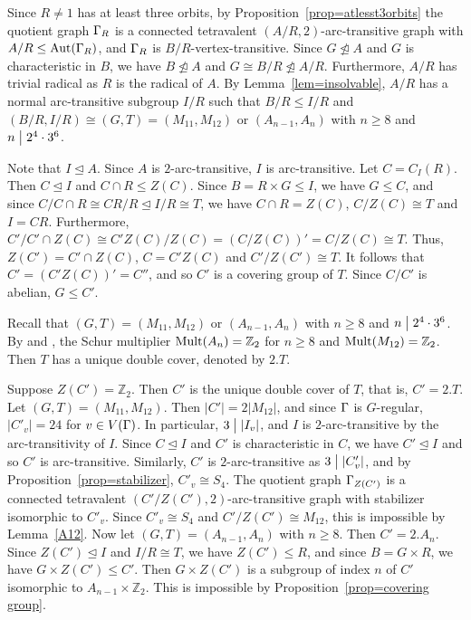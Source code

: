 \documentclass[12pt]{article}
\def\di{\bigm|} \def\lg{\langle} \def\rg{\rangle}
\def\Aut{\hbox{\rm Aut}}
\def\mz{{\mathbb Z}}
\begin{document}
 Since $R\neq 1$ has at least three orbits, by Proposition~\ref{prop=atlesst3orbits} the quotient graph $\Gamma_{R}$ is a connected tetravalent $(A/R,2)$-arc-transitive graph with $A/R\leq \Aut(\G_{R})$, and $\Gamma_R$ is $B/R$-vertex-transitive. Since $G\ntrianglelefteq A$ and $G$ is characteristic in $B$, we have $B\ntrianglelefteq A$ and $G\cong B/R\ntrianglelefteq A/R$. Furthermore, $A/R$ has trivial radical as $R$ is the radical of $A$. By Lemma~\ref{lem=insolvable}, $A/R$ has a normal arc-transitive subgroup $I/R$ such that $B/R\leq  I/R$ and $(B/R,I/R)\cong (G,T)=(M_{11},M_{12})$ or $(A_{n-1},A_n)$ with $n\geq 8$ and $n\di 2^4\cdot 3^6$.

Note that $I\unlhd A$. Since $A$ is $2$-arc-transitive, $I$ is arc-transitive. Let $C=C_I(R)$. Then $C\unlhd I$ and $C\cap R\leq Z(C)$. Since $B=R\times G\leq I$, we have $G\leq C$, and since $C/C\cap R\cong CR/R\unlhd I/R\cong T$, we have $C\cap R=Z(C)$, $C/Z(C)\cong T$ and $I=CR$. Furthermore, $C'/C'\cap Z(C)\cong C'Z(C)/Z(C)=(C/Z(C))'=C/Z(C)\cong  T$. Thus, $Z(C')=C'\cap Z(C)$, $C=C'Z(C)$ and $C'/Z(C')\cong T$. It follows that $C'=(C'Z(C))'=C''$, and so $C'$ is a covering group of $T$. Since $C/C'$ is abelian, $G\leq C'$.

Recall that $(G,T)=(M_{11},M_{12})$ or $(A_{n-1},A_n)$ with $n\geq 8$ and $n\di 2^4\cdot 3^6$. By \cite[Theorem 5.1.4]{Kleidman} and \cite[pp.31]{Atlas}, the Schur multiplier $\Mult(A_n)=\mz_2$ for $n\geq 8$ and $\Mult(M_{12})=\mz_2$. Then $T$ has a unique double cover, denoted by $2.T$.

Suppose $Z(C')=\mz_2$. Then $C'$ is the unique double cover of $T$, that is, $C'=2.T$. Let  $(G,T)=(M_{11},M_{12})$. Then $|C'|=2|M_{12}|$, and since $\Gamma$ is $G$-regular, $|C'_v|=24$  for $v\in V(\Gamma)$. In particular, $3\di |I_v|$, and $I$ is $2$-arc-transitive by the arc-transitivity of $I$. Since $C\unlhd I$ and $C'$ is characteristic in $C$, we have $C'\unlhd I$ and so $C'$ is arc-transitive. Similarly, $C'$ is $2$-arc-transitive as $3\di |C'_v|$, and by Proposition~\ref{prop=stabilizer}, $C'_v\cong S_4$. The quotient graph $\Gamma_{Z(C')}$ is a connected tetravalent $(C'/Z(C'),2)$-arc-transitive graph with stabilizer isomorphic to $C'_v$. Since $C'_v\cong S_4$ and $C'/Z(C')\cong M_{12}$, this is impossible by Lemma~\ref{A12}.
Now let $(G,T)=(A_{n-1},A_n)$ with $n\geq 8$.  Then $C'=2.A_n$. Since $Z(C')\unlhd I$ and $I/R\cong T$, we have $Z(C')\leq R$, and since $B=G\times R$, we have $G\times Z(C')\leq C'$. Then $G\times Z(C')$ is a subgroup of index $n$ of $C'$ isomorphic to $A_{n-1}\times \mz_2$.  This is impossible by Proposition~\ref{prop=covering group}.
\end{document}
